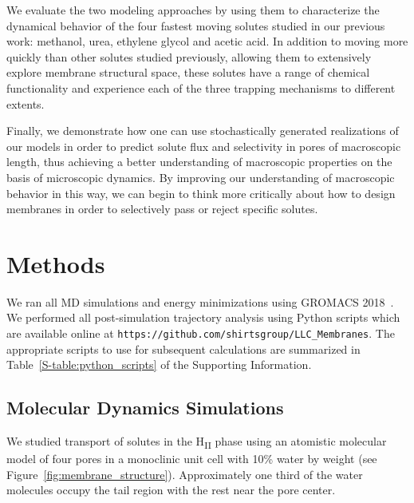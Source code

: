 \documentclass[journal=ancac3,manuscript=article,layout=twocolumn]{achemso}
\begin{document}
  We evaluate the two modeling approaches by using them to characterize the
  dynamical behavior of the four fastest moving solutes studied in our previous
  work: methanol, urea, ethylene glycol and acetic acid. In addition to moving
  more quickly than other solutes studied previously, allowing them to extensively
  explore membrane structural space, these solutes have a range of chemical 
  functionality and experience each of the three trapping mechanisms to different extents.
  
  Finally, we demonstrate how one can use stochastically generated realizations
  of our models in order to predict solute flux and selectivity in pores of 
  macroscopic length, thus achieving a better understanding of macroscopic 
  properties on the basis of microscopic dynamics. By improving our 
  understanding of macroscopic behavior in this way, we can begin to think more
  critically about how to design membranes in order to selectively pass or 
  reject specific solutes.
    
  \section{Methods}
    
  We ran all MD simulations and energy minimizations using GROMACS
  2018~\cite{bekker_gromacs:_1993,berendsen_gromacs:_1995,van_der_spoel_gromacs:_2005,hess_gromacs_2008}.
  We performed all post-simulation trajectory analysis using Python scripts
  which are available online at
  \texttt{https://github.com/shirtsgroup/LLC\_Membranes}. The appropriate
  scripts to use for subsequent calculations are summarized in
  Table~\ref{S-table:python_scripts} of the Supporting Information.
  
  \subsection{Molecular Dynamics Simulations}

  We studied transport of solutes in the H\textsubscript{II} phase using an
  atomistic molecular model of four pores in a monoclinic unit cell with 10\%
  water by weight (see Figure~\ref{fig:membrane_structure}). Approximately one
  third of the water molecules occupy the tail region with the rest near the
  pore center.
  
\end{document}

